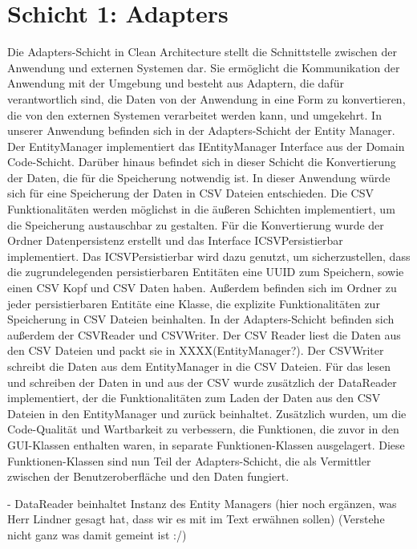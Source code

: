 \section{Schicht 1: Adapters}
Die Adapters-Schicht in Clean Architecture stellt die Schnittstelle zwischen der Anwendung und externen Systemen dar. Sie ermöglicht die Kommunikation der Anwendung mit der Umgebung und besteht aus Adaptern, die dafür verantwortlich sind, die Daten von der Anwendung in eine Form zu konvertieren, die von den externen Systemen verarbeitet werden kann, und umgekehrt.
In unserer Anwendung befinden sich in der Adapters-Schicht der Entity Manager. Der EntityManager implementiert das IEntityManager Interface aus der Domain Code-Schicht. 
Darüber hinaus befindet sich in dieser Schicht die Konvertierung der Daten, die für die Speicherung notwendig ist.  In dieser Anwendung würde sich für eine Speicherung der Daten in CSV Dateien entschieden. Die CSV Funktionalitäten werden möglichst in die äußeren Schichten implementiert, um die Speicherung austauschbar zu gestalten.
Für die Konvertierung wurde der Ordner Datenpersistenz erstellt und das Interface ICSVPersistierbar implementiert. Das ICSVPersistierbar wird dazu genutzt, um sicherzustellen, dass die zugrundelegenden persistierbaren Entitäten eine UUID zum Speichern, sowie einen CSV Kopf und CSV Daten haben. Außerdem befinden sich im Ordner zu jeder persistierbaren Entitäte eine Klasse, die explizite Funktionalitäten zur Speicherung in CSV Dateien beinhalten. 
In der Adapters-Schicht befinden sich außerdem der CSVReader und CSVWriter. Der CSV Reader liest die Daten aus den CSV Dateien und packt sie in XXXX(EntityManager?). Der CSVWriter schreibt die Daten aus dem EntityManager in die CSV Dateien. Für das lesen und schreiben der Daten in und aus der CSV wurde zusätzlich der DataReader implementiert, der die Funktionalitäten zum Laden der Daten aus den CSV Dateien in den EntityManager und zurück beinhaltet.
Zusätzlich wurden, um die Code-Qualität und Wartbarkeit zu verbessern,  die Funktionen, die zuvor in den GUI-Klassen enthalten waren, in separate Funktionen-Klassen ausgelagert. Diese Funktionen-Klassen sind nun Teil der Adapters-Schicht, die als Vermittler zwischen der Benutzeroberfläche und den Daten fungiert.

    - DataReader beinhaltet Instanz des Entity Managers
    (hier noch ergänzen, was Herr Lindner gesagt hat, dass wir es mit im Text erwähnen sollen) (Verstehe nicht ganz was damit gemeint ist :/)




